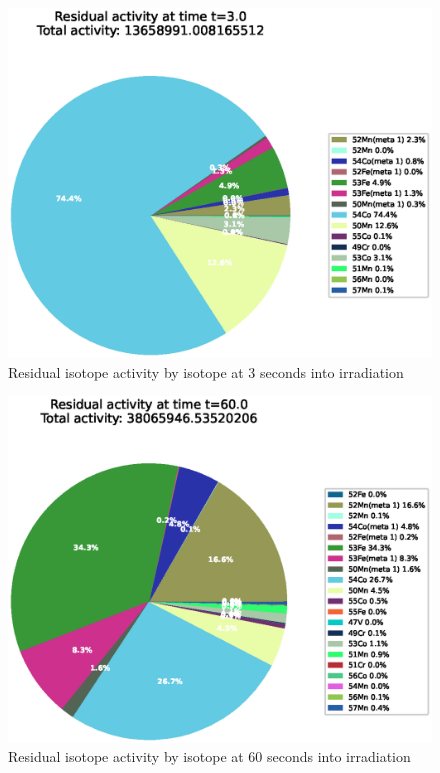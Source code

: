 \begin{figure}[!htb]
\centering
\includegraphics[width=0.8\linewidth]{chapters/activity_code/fe-activity-v2/residual-activity/0001_3.eps}
\caption{Residual isotope activity by isotope at 3 seconds into irradiation}
\label{fig:activity-v2-residual-activity-3s}
\end{figure}

\begin{figure}[!htb]
\centering
\includegraphics[width=0.8\linewidth]{chapters/activity_code/fe-activity-v2/residual-activity/0020_60.eps}
\caption{Residual isotope activity by isotope at 60 seconds into irradiation}
\label{fig:activity-v2-residual-activity-60s}
\end{figure}

